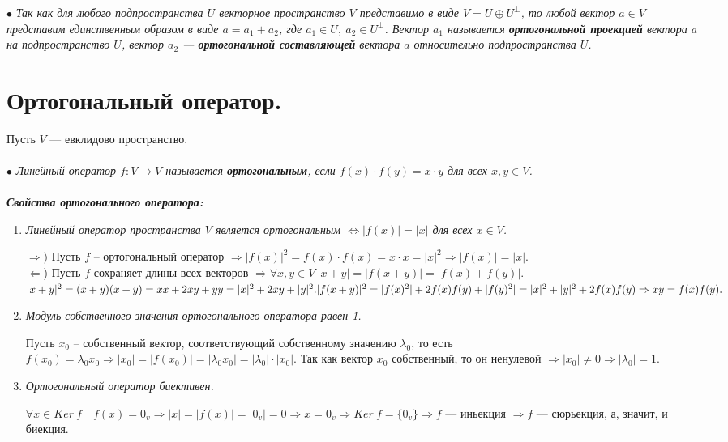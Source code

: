 $\bullet$ \textit{Так как для любого подпространства $U$ векторное пространство $V$ представимо в виде $V = U\oplus U^\perp$, то любой вектор $a\in V$ представим единственным образом в виде $a = a_1 + a_2$, где $a_1\in U,\ a_2 \in U^\perp$. Вектор $a_1$ называется \textbf{ортогональной проекцией} вектора $a$ на подпространство $U$, вектор $a_2$ --- \textbf{ортогональной составляющей} вектора $a$ относительно подпространства $U$.}










\section{Ортогональный оператор.}
Пусть $V$ --- евклидово пространство.\\\\
$\bullet$ \textit{Линейный оператор $f: V \to V$ называется \textbf{ортогональным}, если $f(x)\cdot f(y) = x\cdot y$ для всех $x,y \in V$.}\\\\
\textit{ \textbf{Свойства ортогонального оператора:}}\begin{enumerate}
	\item \textit{Линейный оператор пространства $V$ является ортогональным $\Longleftrightarrow |f(x)| = |x|$ для всех $x \in V$.}\begin{Proof}
		$\Rightarrow)$ Пусть $f$ -- ортогональный оператор $\Rightarrow |f(x)|^2 = f(x) \cdot f(x) = x \cdot x = |x|^2\Rightarrow |f(x)| = |x|.$\\
		$\Leftarrow$) Пусть $f$ сохраняет длины всех векторов $\Rightarrow \forall x,y \in V\ |x + y| = |f(x+y)| = |f(x) + f(y)|. $\\
		$|x + y|^2 = (x+y)(x+y) = x x + 2xy + y y = |x|^2 + 2xy + |y|^2.\\ |f(x + y)|^2  =  |f(x)^2|+ 2 f(x)f(y) + |f(y)^2| = |x|^2 + |y|^2 + 2f(x)f(y) \Rightarrow xy = f(x)f(y).$
	\end{Proof}
	\item \textit{Модуль собственного значения ортогонального оператора равен 1.}
	\begin{Proof}
		Пусть $x_0$ -- собственный вектор, соответствующий собственному значению $\lambda_{0}$, то есть $f(x_0) = \lambda_{0}x_0 \Rightarrow |x_0| = |f(x_0)| = |\lambda_{0}x_0| = |\lambda_{0}|\cdot|x_0|$. Так как вектор $x_0$ собственный, то он ненулевой $\Rightarrow |x_0| \ne 0\Rightarrow|\lambda_0| = 1$.
	\end{Proof}
	\item \textit{Ортогональный оператор биективен.}\begin{Proof}
		$\forall x \in Ker\ f \quad f(x) = 0_v \Rightarrow |x| = |f(x)| = |0_{v}| = 0 \Rightarrow x= 0_{v} \Rightarrow Ker\ f = \{ 0_{v} \}  \Rightarrow f$ --- иньекция $ \Rightarrow f$ --- сюрьекция, а, значит, и биекция.
	\end{Proof}
\end{enumerate}
